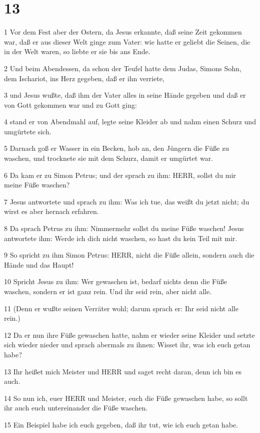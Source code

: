 \chapter{13}

\par 1 Vor dem Fest aber der Ostern, da Jesus erkannte, daß seine Zeit gekommen war, daß er aus dieser Welt ginge zum Vater: wie hatte er geliebt die Seinen, die in der Welt waren, so liebte er sie bis ans Ende.
\par 2 Und beim Abendessen, da schon der Teufel hatte dem Judas, Simons Sohn, dem Ischariot, ins Herz gegeben, daß er ihn verriete,
\par 3 und Jesus wußte, daß ihm der Vater alles in seine Hände gegeben und daß er von Gott gekommen war und zu Gott ging:
\par 4 stand er von Abendmahl auf, legte seine Kleider ab und nahm einen Schurz und umgürtete sich.
\par 5 Darnach goß er Wasser in ein Becken, hob an, den Jüngern die Füße zu waschen, und trocknete sie mit dem Schurz, damit er umgürtet war.
\par 6 Da kam er zu Simon Petrus; und der sprach zu ihm: HERR, sollst du mir meine Füße waschen?
\par 7 Jesus antwortete und sprach zu ihm: Was ich tue, das weißt du jetzt nicht; du wirst es aber hernach erfahren.
\par 8 Da sprach Petrus zu ihm: Nimmermehr sollst du meine Füße waschen! Jesus antwortete ihm: Werde ich dich nicht waschen, so hast du kein Teil mit mir.
\par 9 So spricht zu ihm Simon Petrus: HERR, nicht die Füße allein, sondern auch die Hände und das Haupt!
\par 10 Spricht Jesus zu ihm: Wer gewaschen ist, bedarf nichts denn die Füße waschen, sondern er ist ganz rein. Und ihr seid rein, aber nicht alle.
\par 11 (Denn er wußte seinen Verräter wohl; darum sprach er: Ihr seid nicht alle rein.)
\par 12 Da er nun ihre Füße gewaschen hatte, nahm er wieder seine Kleider und setzte sich wieder nieder und sprach abermals zu ihnen: Wisset ihr, was ich euch getan habe?
\par 13 Ihr heißet mich Meister und HERR und saget recht daran, denn ich bin es auch.
\par 14 So nun ich, euer HERR und Meister, euch die Füße gewaschen habe, so sollt ihr auch euch untereinander die Füße waschen.
\par 15 Ein Beispiel habe ich euch gegeben, daß ihr tut, wie ich euch getan habe.

